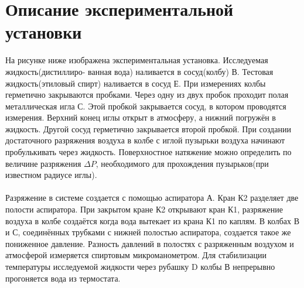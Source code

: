 \documentclass[a4paper, 12pt]{article}
\begin{document}
	\section*{Описание экспериментальной установки}
		На рисунке ниже изображена экспериментальная установка. Исследуемая жидкость(дистиллиро- ванная вода) наливается в сосуд(колбу) В. Тестовая жидкость(этиловый спирт) наливается в сосуд Е. При измерениях колбы герметично закрываются пробками. Через одну из двух пробок проходит полая металлическая игла С. Этой пробкой закрывается сосуд, в котором проводятся измерения. Верхний конец иглы открыт в атмосферу, а нижний погружён в жидкость. Другой сосуд герметично закрывается второй пробкой. При создании достаточного разряжения воздуха в колбе с иглой пузырьки воздуха начинают пробулькивать через жидкость. Поверхностное натяжение можно определить по величине разряжения $\Delta P$, необходимого для прохождения пузырьков(при известном радиусе иглы).
		\\
		\\
		Разряжение в системе создается с помощью аспиратора А. Кран К2 разделяет две полости аспиратора. При закрытом кране К2 открывают кран К1, разряжение воздуха в колбе создаётся когда вода вытекает из крана К1 по каплям. В колбах В и С, соединённых трубками с нижней полостью аспиратора, создается такое же пониженное давление. Разность давлений в полостях с разряженным воздухом и атмосферой измеряется спиртовым микроманометром. Для стабилизации температуры исследуемой жидкости через рубашку D колбы В непрерывно прогоняется вода из термостата. 
		\begin{figure}[h]
		\end{figure}
		\\
\end{document}
